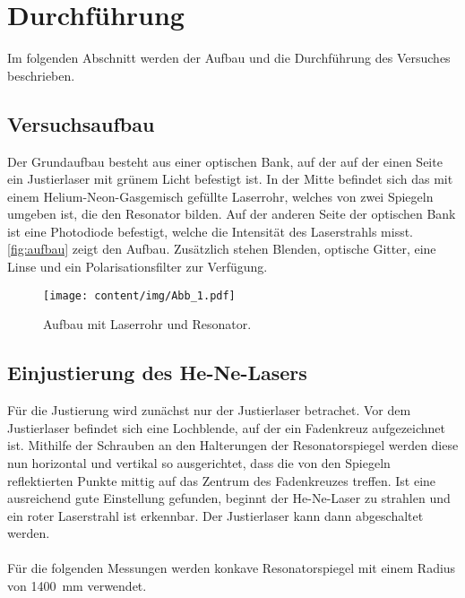 \section{Durchführung}
\label{sec:durchfuehrung}

    Im folgenden Abschnitt werden der Aufbau und die Durchführung des Versuches beschrieben.

\subsection{Versuchsaufbau}
\label{sec:versuchsaufbau}

    Der Grundaufbau besteht aus einer optischen Bank,
    auf der auf der einen Seite ein Justierlaser mit grünem Licht befestigt ist.
    In der Mitte befindet sich das mit einem Helium-Neon-Gasgemisch gefüllte Laserrohr,
    welches von zwei Spiegeln umgeben ist,
    die den Resonator bilden.
    Auf der anderen Seite der optischen Bank ist eine Photodiode befestigt,
    welche die Intensität des Laserstrahls misst.
    \autoref{fig:aufbau} zeigt den Aufbau.
    Zusätzlich stehen Blenden, optische Gitter, eine Linse und ein Polarisationsfilter zur Verfügung.

    \begin{figure}
      \centering
      \texttt{[image: content/img/Abb\_1.pdf]}
      \caption{Aufbau mit Laserrohr und Resonator.}
      \label{fig:aufbau}
    \end{figure}


\subsection{Einjustierung des He-Ne-Lasers}

    Für die Justierung wird zunächst nur der Justierlaser betrachet.
    Vor dem Justierlaser befindet sich eine Lochblende,
    auf der ein Fadenkreuz aufgezeichnet ist.
    Mithilfe der Schrauben an den Halterungen der Resonatorspiegel werden diese nun horizontal und vertikal so ausgerichtet,
    dass die von den Spiegeln reflektierten Punkte mittig auf das Zentrum des Fadenkreuzes treffen.
    Ist eine ausreichend gute Einstellung gefunden,
    beginnt der He-Ne-Laser zu strahlen
    und ein roter Laserstrahl ist erkennbar.
    Der Justierlaser kann dann abgeschaltet werden.\\
    \\
    Für die folgenden Messungen werden konkave Resonatorspiegel mit einem Radius von \SI{1400}{\milli\meter} verwendet.


